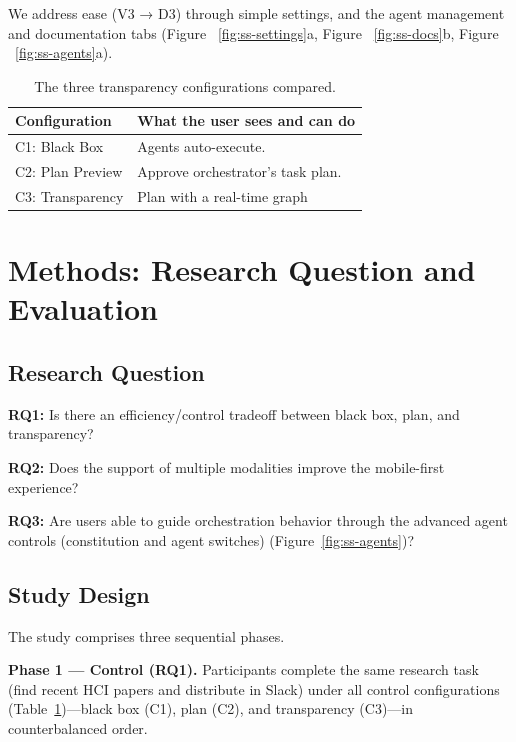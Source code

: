 \documentclass[sigconf, anonymous]{acmart}
\begin{document}
We address ease (V3 → D3) through simple settings, and the agent management and documentation tabs (Figure ~\ref{fig:ss-settings}a, Figure ~\ref{fig:ss-docs}b, Figure ~\ref{fig:ss-agents}a).

\begin{table}[h]
  \caption{The three transparency configurations compared.}
  \label{tab:transparency}
  \small
  \begin{tabular}{p{} p{}}
    \toprule
    Configuration & What the user sees and can do \\
    \midrule
    C1: Black Box & Agents auto-execute. \\
    C2: Plan Preview & Approve orchestrator's task plan. \\
    C3: Transparency &  Plan with a real-time graph \\
    \bottomrule
  \end{tabular}
\end{table}

\section{Methods: Research Question and Evaluation}

\subsection{Research Question}

\textbf{RQ1:} Is there an efficiency/control tradeoff between black box, plan, and transparency?

\textbf{RQ2:} Does the support of multiple modalities improve the mobile-first experience?

\textbf{RQ3:} Are users able to guide orchestration behavior through the advanced agent controls (constitution and agent switches) (Figure~\ref{fig:ss-agents})?

\subsection{Study Design}

The study comprises three sequential phases.

\textbf{Phase 1 --- Control (RQ1).} Participants complete the same research task (find recent HCI papers and distribute in Slack) under all control configurations (Table~\ref{tab:transparency})---black box (C1), plan (C2), and transparency (C3)---in counterbalanced order.
\end{document}
